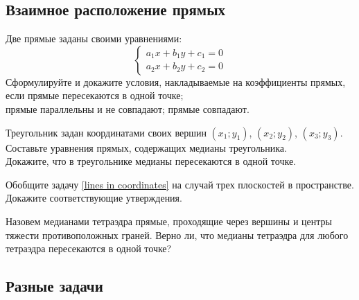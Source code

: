 \subsection*{Взаимное расположение прямых}

\begin{problems}

\item \label{lines in coordinates}
Две прямые заданы своими уравнениями:
\[\left\{\begin{aligned}
    a_1 x + b_1 y + c_1 = 0\\
    a_2 x + b_2 y + c_2 = 0
\end{aligned}\right.\]
Сформулируйте и докажите условия, накладываемые на коэффициенты прямых, если
\quad
\sbp прямые пересекаются в одной точке;
\\
\sbp прямые параллельны и не совпадают;
\quad
\sbp прямые совпадают.

\item
Треугольник задан координатами своих вершин
$(x_1; y_1)$, $(x_2; y_2)$, $(x_3; y_3)$.
\\
\sbp Составьте уравнения прямых, содержащих медианы треугольника.
\\
\sbp Докажите, что в треугольнике медианы пересекаются в одной точке.

\item
Обобщите задачу \ref{lines in coordinates} на случай трех плоскостей в
пространстве.
Докажите соответствующие утверждения.

\item
Назовем медианами тетраэдра прямые, проходящие через вершины и центры тяжести
противоположных граней.
Верно ли, что медианы тетраэдра для любого тетраэдра пересекаются в одной
точке?

\end{problems}

\subsection*{Разные задачи}

